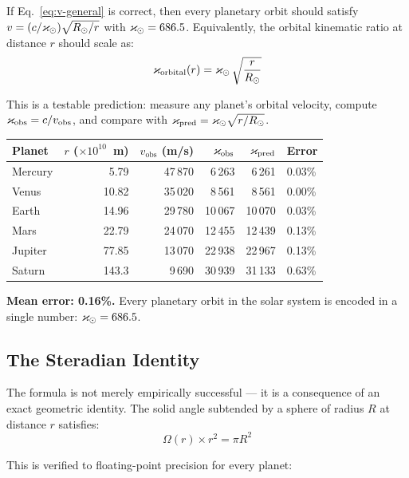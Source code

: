 If Eq.~\eqref{eq:v-general} is correct, then every planetary orbit should satisfy $v = (c/\varkappa_\odot)\sqrt{R_\odot/r}$ with $\varkappa_\odot = 686.5$.  Equivalently, the orbital kinematic ratio at distance $r$ should scale as:
\begin{equation}\label{eq:kop-scaling}
  \varkappa_{\text{orbital}}(r) = \varkappa_\odot\,\sqrt{\frac{r}{R_\odot}}
\end{equation}

This is a testable prediction: measure any planet's orbital velocity, compute $\varkappa_{\text{obs}} = c/v_{\text{obs}}$, and compare with $\varkappa_{\text{pred}} = \varkappa_\odot\sqrt{r/R_\odot}$.

\begin{center}
\begin{tabular}{lrrrrl}
\toprule
\textbf{Planet} & $r$ ($\times 10^{10}$~m) & $v_{\text{obs}}$ (m/s) & $\varkappa_{\text{obs}}$ & $\varkappa_{\text{pred}}$ & Error \\
\midrule
Mercury  & 5.79  & 47\,870 &  6\,263 &  6\,261 & 0.03\% \\
Venus    & 10.82 & 35\,020 &  8\,561 &  8\,561 & 0.00\% \\
Earth    & 14.96 & 29\,780 & 10\,067 & 10\,070 & 0.03\% \\
Mars     & 22.79 & 24\,070 & 12\,455 & 12\,439 & 0.13\% \\
Jupiter  & 77.85 & 13\,070 & 22\,938 & 22\,967 & 0.13\% \\
Saturn   & 143.3 &  9\,690 & 30\,939 & 31\,133 & 0.63\% \\
\bottomrule
\end{tabular}
\end{center}

\textbf{Mean error: 0.16\%.}  Every planetary orbit in the solar system is encoded in a single number: $\varkappa_\odot = 686.5$.

\subsection{The Steradian Identity}

The formula is not merely empirically successful --- it is a consequence of an exact geometric identity.  The solid angle subtended by a sphere of radius $R$ at distance $r$ satisfies:
\begin{equation}\label{eq:steradian}
  \Omega(r) \times r^2 = \pi R^2
\end{equation}

This is verified to floating-point precision for every planet:

